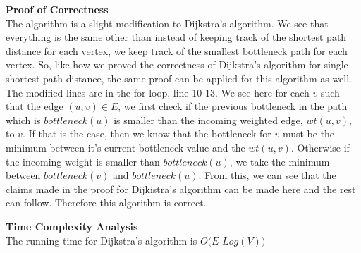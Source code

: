 \documentclass[12pt]{article}
\begin{document}
\begin{enumerate}
\begin{enumerate}
\textbf{Proof of Correctness}
\\The algorithm is a slight modification to Dijkstra's algorithm. We see that everything is the same other than instead of keeping track of the shortest path distance for each vertex, we keep track of the smallest bottleneck path for each vertex. So, like how we proved the correctness of Dijkstra's algorithm for single shortest path distance, the same proof can be applied for this algorithm as well.
The modified lines are in the for loop, line 10-13. We see here for each $v$ such that the edge $(u,v)\in E$, we first check if the previous bottleneck in the path which is  $bottleneck(u)$ is smaller than the incoming weighted edge, $wt(u,v)$, to $v$. If that is the case, then we know that the bottleneck for $v$ must be the minimum between it's current bottleneck value and the $wt(u,v)$. Otherwise if the incoming weight is smaller than $bottleneck(u)$, we take the minimum between $bottleneck(v)$ and $bottleneck(u)$. From this, we can see that the claims made in the proof for Dijkistra's algorithm can be made here and the rest can follow. Therefore this algorithm is correct.

\textbf{Time Complexity Analysis}
\\The running time for Dijkstra's algorithm is $O(E $ $Log (V))$


\end{enumerate}

\end{enumerate}
\end{document}
